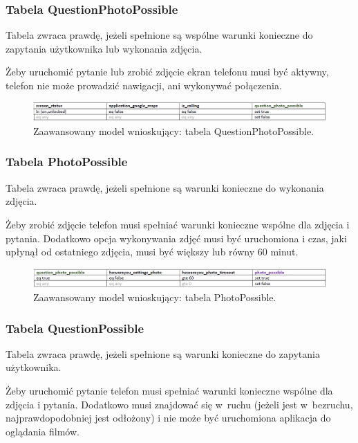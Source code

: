 \subsubsection{Tabela QuestionPhotoPossible}

Tabela zwraca prawdę, jeżeli spełnione są wspólne warunki konieczne do zapytania użytkownika lub wykonania zdjęcia.

Żeby uruchomić pytanie lub zrobić zdjęcie ekran telefonu musi być aktywny, telefon nie może prowadzić nawigacji, ani wykonywać połączenia.

\begin{figure}[H]
	\centering
	\includegraphics[scale=0.75]{rozdzial4/HMR_QuestionPhotoPossible.png}
	\caption{Zaawansowany model wnioskujący: tabela QuestionPhotoPossible.}
\end{figure}


\subsubsection{Tabela PhotoPossible}

Tabela zwraca prawdę, jeżeli spełnione są warunki konieczne do wykonania zdjęcia.

Żeby zrobić zdjęcie telefon musi spełniać warunki konieczne wspólne dla zdjęcia i pytania. Dodatkowo opcja wykonywania zdjęć musi być uruchomiona i czas, jaki upłynął od ostatniego zdjęcia, musi być większy lub równy 60 minut.

\begin{figure}[H]
	\centering
	\includegraphics[scale=0.75]{rozdzial4/HMR_PhotoPossible.png}
	\caption{Zaawansowany model wnioskujący: tabela PhotoPossible.}
\end{figure}


\subsubsection{Tabela QuestionPossible}

Tabela zwraca prawdę, jeżeli spełnione są warunki konieczne do zapytania użytkownika.

Żeby uruchomić pytanie telefon musi spełniać warunki konieczne wspólne dla zdjęcia i pytania. Dodatkowo musi znajdować się w~ruchu (jeżeli jest w~bezruchu, najprawdopodobniej jest odłożony) i nie może być uruchomiona aplikacja do oglądania filmów. 

